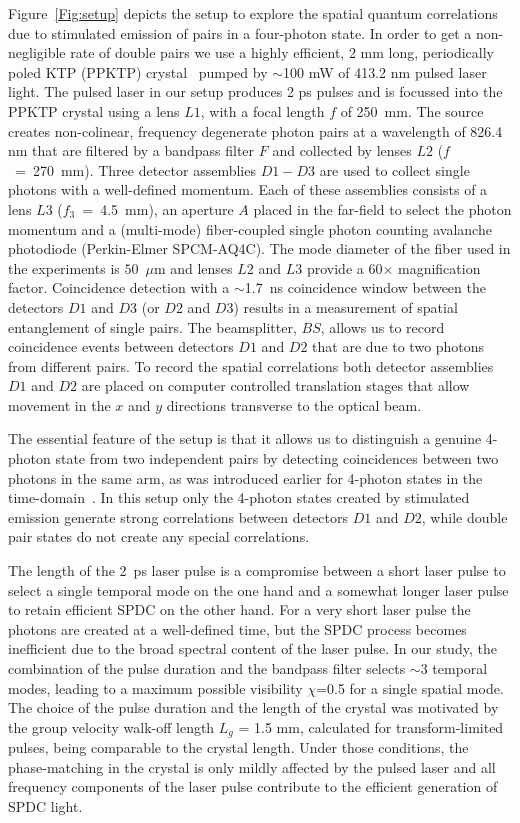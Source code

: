 Figure~\ref{Fig:setup} depicts the setup to explore the spatial quantum correlations due to stimulated emission of pairs in a four-photon state. In order to get a non-negligible rate of double pairs we use a highly efficient, 2 mm long, periodically poled KTP (PPKTP) crystal~\cite{Peeters2008} pumped by $\sim$100 mW of 413.2 nm pulsed laser light. The pulsed laser in our setup produces 2 ps pulses and is focussed into the PPKTP crystal using a lens $L1$, with a focal length $f$ of 250~mm. The source creates non-colinear, frequency degenerate photon pairs at a wavelength of 826.4 nm that are filtered by a bandpass filter $F$ and collected by lenses $L2$ ($f$~=~270~mm). Three detector assemblies $D1-D3$ are used to collect single photons with a well-defined momentum. Each of these assemblies consists of a lens $L3$ ($f_3$~=~4.5~mm), an aperture $A$ placed in the far-field to select the photon momentum and a (multi-mode) fiber-coupled single photon counting avalanche photodiode (Perkin-Elmer SPCM-AQ4C). The mode diameter of the fiber used in the experiments is $50$~$\mu$m and lenses $L2$ and $L3$ provide a 60$\times$ magnification factor. Coincidence detection with a $\sim$1.7~ns coincidence window between the detectors $D1$ and $D3$ (or $D2$ and $D3$) results in a measurement of spatial entanglement of single pairs. The beamsplitter, $BS$, allows us to record coincidence events between detectors $D1$ and $D2$ that are due to two photons from different pairs. To record the spatial correlations both detector assemblies $D1$ and $D2$ are placed on computer controlled translation stages that allow movement in the $x$ and $y$ directions transverse to the optical beam.

The essential feature of the setup is that it allows us to distinguish a genuine 4-photon state from two independent pairs by detecting coincidences between two photons in the same arm, as was introduced earlier for 4-photon states in the time-domain~\cite{Riedmatten2004}. In this setup only the 4-photon states created by stimulated emission generate strong correlations between detectors $D1$ and $D2$, while double pair states do not create any special correlations.

The length of the 2~ps laser pulse is a compromise between a short laser pulse to select a single temporal mode on the one hand and a somewhat longer laser pulse to retain efficient SPDC on the other hand. For a very short laser pulse the photons are created at a well-defined time, but the SPDC process becomes inefficient due to the broad spectral content of the laser pulse. In our study, the combination of the pulse duration and the bandpass filter selects $\sim$3 temporal modes, leading to a maximum possible visibility $\chi$=0.5 for a single spatial mode. The choice of the pulse duration and the length of the crystal was motivated by the group velocity walk-off length $L_g$ = 1.5 mm, calculated for transform-limited pulses, being comparable to the crystal length. Under those conditions, the phase-matching in the crystal is only mildly affected by the pulsed laser and all frequency components of the laser pulse contribute to the efficient generation of SPDC light.

